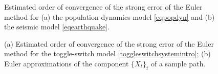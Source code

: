 \documentclass[reqno,12pt]{amsart}
\theoremstyle{plain} %
\theoremstyle{definition} %
\begin{document}
\begin{figure}[htb]
    \caption{Estimated order of convergence of the strong error of the Euler method for (a) the population dynamics model \cref{eqpopdyn} and (b) the seismic model \cref{eqearthquake}.}
    \label{figallcombinedpopdynrisk}
\end{figure}

\begin{figure}[htb]
    \caption{(a) Estimated order of convergence of the strong error of the Euler method for the toggle-switch model \cref{toggleswitchsystemintro}; (b) Euler approximations of the component $\{X_t\}_t$ of a sample path.}
    \label{figtoggleswitchintro}
\end{figure}
\end{document}
